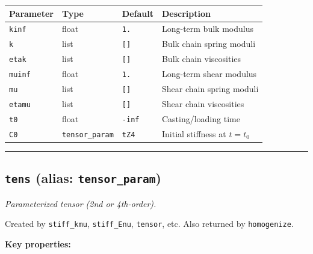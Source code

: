 \documentclass[
  a4paper,
  numbers=noendperiod,
  DIV=12]{scrreprt}
\newcounter{none} %
\begin{document}
{\def\LTcaptype{none} %
\begin{longtable}[]{@{}llll@{}}
\toprule\noalign{}
Parameter & Type & Default & Description \\
\midrule\noalign{}
\endhead
\bottomrule\noalign{}
\endlastfoot
\texttt{kinf} & float & \texttt{1.} & Long-term bulk modulus \\
\texttt{k} & list & \texttt{{[}{]}} & Bulk chain spring moduli \\
\texttt{etak} & list & \texttt{{[}{]}} & Bulk chain viscosities \\
\texttt{muinf} & float & \texttt{1.} & Long-term shear modulus \\
\texttt{mu} & list & \texttt{{[}{]}} & Shear chain spring moduli \\
\texttt{etamu} & list & \texttt{{[}{]}} & Shear chain viscosities \\
\texttt{t0} & float & \texttt{-inf} & Casting/loading time \\
\texttt{C0} & \texttt{tensor\_param} & \texttt{tZ4} & Initial stiffness
at \(t=t_0\) \\
\end{longtable}
}

\begin{center}\rule{0.5\linewidth}{0.5pt}\end{center}

\subsection{\texorpdfstring{\texttt{tens} (alias:
\texttt{tensor\_param})}{tens (alias: tensor\_param)}}\label{api-tens}

\emph{Parameterized tensor (2nd or 4th-order).}

Created by \texttt{stiff\_kmu}, \texttt{stiff\_Enu}, \texttt{tensor},
etc. Also returned by \texttt{homogenize}.

\textbf{Key properties:}
\end{document}
